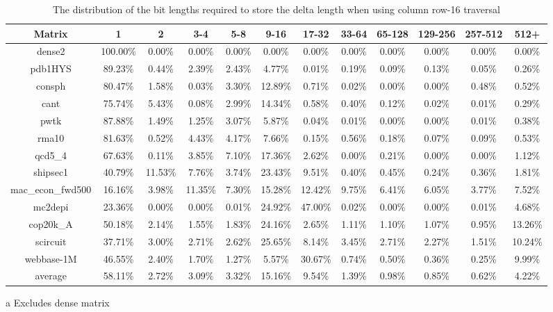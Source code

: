 \begin{sidewaystable}
\centering
\begin{threeparttable}
    \caption[The distribution of deltas by bit length]{The distribution of the bit lengths required to store the delta length when using column row-16 traversal}
\label{tbl:indexDist}
\begin{tabular}{cccccccccccc}
\hline
\bfseries Matrix & \bfseries 1 & \bfseries 2 & \bfseries 3-4 & \bfseries 5-8 & \bfseries 9-16 & \bfseries 17-32 & \bfseries 33-64 &\bfseries 65-128 & \bfseries 129-256 & \bfseries 257-512 & \bfseries 512+\\
\hline
dense2 & 100.00\% & 0.00\% & 0.00\% & 0.00\% & 0.00\% & 0.00\% & 0.00\% & 0.00\% & 0.00\% & 0.00\% & 0.00\% \\
pdb1HYS & 89.23\% & 0.44\% & 2.39\% & 2.43\% & 4.77\% & 0.01\% & 0.19\% & 0.09\% & 0.13\% & 0.05\% & 0.26\% \\
consph & 80.47\% & 1.58\% & 0.03\% & 3.30\% & 12.89\% & 0.71\% & 0.02\% & 0.00\% & 0.00\% & 0.48\% & 0.52\% \\
cant & 75.74\% & 5.43\% & 0.08\% & 2.99\% & 14.34\% & 0.58\% & 0.40\% & 0.12\% & 0.02\% & 0.01\% & 0.29\% \\
pwtk & 87.88\% & 1.49\% & 1.25\% & 3.07\% & 5.87\% & 0.04\% & 0.01\% & 0.00\% & 0.00\% & 0.01\% & 0.38\% \\
rma10 & 81.63\% & 0.52\% & 4.43\% & 4.17\% & 7.66\% & 0.15\% & 0.56\% & 0.18\% & 0.07\% & 0.09\% & 0.53\% \\
qcd5\_4 & 67.63\% & 0.11\% & 3.85\% & 7.10\% & 17.36\% & 2.62\% & 0.00\% & 0.21\% & 0.00\% & 0.00\% & 1.12\% \\
shipsec1 & 40.79\% & 11.53\% & 7.76\% & 3.74\% & 23.43\% & 9.51\% & 0.40\% & 0.45\% & 0.24\% & 0.36\% & 1.81\% \\
mac\_econ\_fwd500 & 16.16\% & 3.98\% & 11.35\% & 7.30\% & 15.28\% & 12.42\% & 9.75\% & 6.41\% & 6.05\% & 3.77\% & 7.52\% \\
mc2depi & 23.36\% & 0.00\% & 0.00\% & 0.01\% & 24.92\% & 47.00\% & 0.02\% & 0.00\% & 0.00\% & 0.01\% & 4.68\% \\
cop20k\_A & 50.18\% & 2.14\% & 1.55\% & 1.83\% & 24.16\% & 2.65\% & 1.11\% & 1.10\% & 1.07\% & 0.95\% & 13.26\% \\
scircuit & 37.71\% & 3.00\% & 2.71\% & 2.62\% & 25.65\% & 8.14\% & 3.45\% & 2.71\% & 2.27\% & 1.51\% & 10.24\% \\
webbase-1M & 46.55\% & 2.40\% & 1.70\% & 1.27\% & 5.57\% & 30.67\% & 0.74\% & 0.50\% & 0.36\% & 0.25\% & 9.99\% \\
\hline
average\tnote{a} & 58.11\% & 2.72\% & 3.09\% & 3.32\% & 15.16\% & 9.54\% & 1.39\% & 0.98\% & 0.85\% & 0.62\% & 4.22\% \\
\hline
\end{tabular}
\begin{tablenotes}
\item [a] Excludes dense matrix
\end{tablenotes}
\end{threeparttable}
\end{sidewaystable}%
